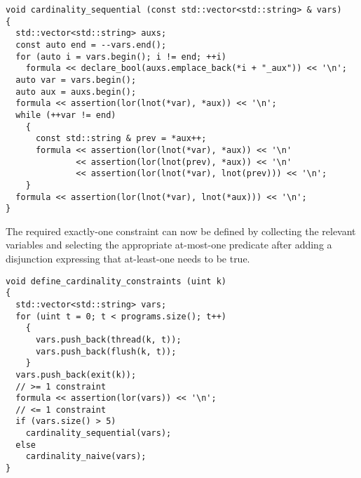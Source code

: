 \begin{lstlisting}[style=c++]
void cardinality_sequential (const std::vector<std::string> & vars)
{
  std::vector<std::string> auxs;
  const auto end = --vars.end();
  for (auto i = vars.begin(); i != end; ++i)
    formula << declare_bool(auxs.emplace_back(*i + "_aux")) << '\n';
  auto var = vars.begin();
  auto aux = auxs.begin();
  formula << assertion(lor(lnot(*var), *aux)) << '\n';
  while (++var != end)
    {
      const std::string & prev = *aux++;
      formula << assertion(lor(lnot(*var), *aux)) << '\n'
              << assertion(lor(lnot(prev), *aux)) << '\n'
              << assertion(lor(lnot(*var), lnot(prev))) << '\n';
    }
  formula << assertion(lor(lnot(*var), lnot(*aux))) << '\n';
}
\end{lstlisting}

%
%
%


\noindent
The required exactly-one constraint can now be defined by collecting the relevant variables and selecting the appropriate at-most-one predicate after adding a disjunction expressing that at-least-one needs to be true.

\begin{lstlisting}[style=c++]
void define_cardinality_constraints (uint k)
{
  std::vector<std::string> vars;
  for (uint t = 0; t < programs.size(); t++)
    {
      vars.push_back(thread(k, t));
      vars.push_back(flush(k, t));
    }
  vars.push_back(exit(k));
  // >= 1 constraint
  formula << assertion(lor(vars)) << '\n';
  // <= 1 constraint
  if (vars.size() > 5)
    cardinality_sequential(vars);
  else
    cardinality_naive(vars);
}
\end{lstlisting}

